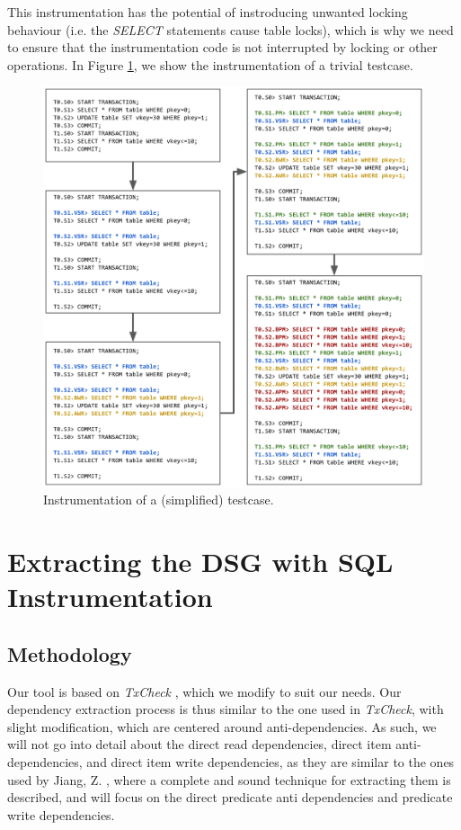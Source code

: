 This instrumentation has the potential of instroducing unwanted locking behaviour (i.e. the \textit{SELECT} statements cause table locks), which is why we need to ensure that the instrumentation code is not interrupted by locking or other operations. In Figure \ref{fig:sql_instrumentation_sample}, we show the instrumentation of a trivial testcase.

\begin{figure}[!h]
    \centering
    \includegraphics[width=\linewidth]{assets/sql_instrumentation_sample.png}
    \caption{Instrumentation of a (simplified) testcase.}
    \label{fig:sql_instrumentation_sample}
\end{figure}



\section{Extracting the DSG with SQL Instrumentation}

\subsection{Methodology}

Our tool is based on \textit{TxCheck} \cite{jiang2023detecting}, which we modify to suit our needs. Our dependency extraction process is thus similar to the one used in \textit{TxCheck}, with slight modification, which are centered around anti-dependencies. As such, we will not go into detail about the direct read dependencies, direct item anti-dependencies, and direct item write dependencies, as they are similar to the ones used by Jiang, Z. \cite{jiang2023detecting}, where a complete and sound technique for extracting them is described, and will focus on the direct predicate anti dependencies and predicate write dependencies.

